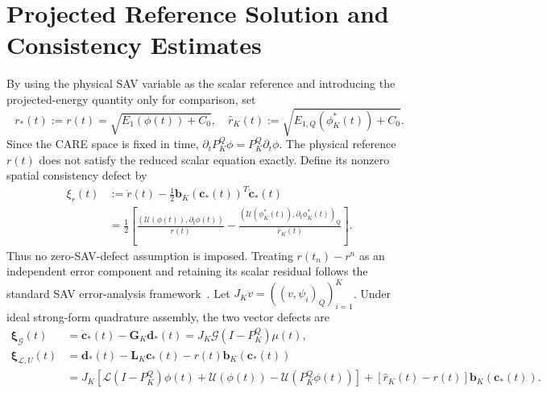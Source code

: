 \documentclass[10pt,reqno]{amsart}
\theoremstyle{remark}
\theoremstyle{definition}
\begin{document}
\section{Projected Reference Solution and Consistency Estimates}
\label{sec:Projected Reference Solution and Consistency Estimates}
By using the physical SAV variable as the scalar reference and introducing the projected-energy quantity only for comparison, set
$$
r_*(t):=r(t)=\sqrt{E_1(\phi(t))+C_0},
\quad
\widehat r_K(t):=\sqrt{E_{1,Q}(\phi_K^*(t))+C_0}.
$$
Since the CARE space is fixed in time, $\partial_tP_K^Q\phi=P_K^Q\partial_t\phi$. The physical reference $r(t)$ does not satisfy the reduced scalar equation exactly. Define its nonzero spatial consistency defect by
\begin{equation}\label{eq:SM nonzero spatial consistency}
\begin{aligned}
\xi_r(t)&:=\dot r(t)-\frac12\boldsymbol b_K(\boldsymbol c_*(t))^{T}\dot{\boldsymbol c}_*(t)\\
&=\frac12\left[\frac{(\mathcal U(\phi(t)),\partial_t\phi(t))}{r(t)}-\frac{(\mathcal U(\phi_K^*(t)),\partial_t\phi_K^*(t))_Q}{\widehat r_K(t)}\right].
\end{aligned}
\end{equation}
Thus no zero-SAV-defect assumption is imposed. Treating $r(t_n)-r^n$ as an independent error component and retaining its scalar residual follows the standard SAV error-analysis framework~\cite{SHENXU20182895,Chen2020SAVFEM}. Let $J_Kv=((v,\psi_i)_Q)_{i=1}^K$. Under ideal strong-form quadrature assembly, the two vector defects are
\begin{equation}
  \begin{aligned}
    \boldsymbol\xi_{\mathcal G}(t)&=\dot{\boldsymbol c}_*(t)-\boldsymbol{G}_K\boldsymbol d_*(t)=J_K\mathcal G(I-P_K^Q)\mu(t),\\
    \boldsymbol\xi_{\mathcal L,U}(t)&=\boldsymbol d_*(t)-\boldsymbol{L}_K\boldsymbol c_*(t)-r(t)\boldsymbol b_K(\boldsymbol c_*(t))\\
    &=J_K\left[\mathcal L(I-P_K^Q)\phi(t)+\mathcal U(\phi(t))-\mathcal U(P_K^Q\phi(t))\right]+[\widehat r_K(t)-r(t)]\boldsymbol b_K(\boldsymbol c_*(t)).
  \end{aligned}
\end{equation}
\end{document}
